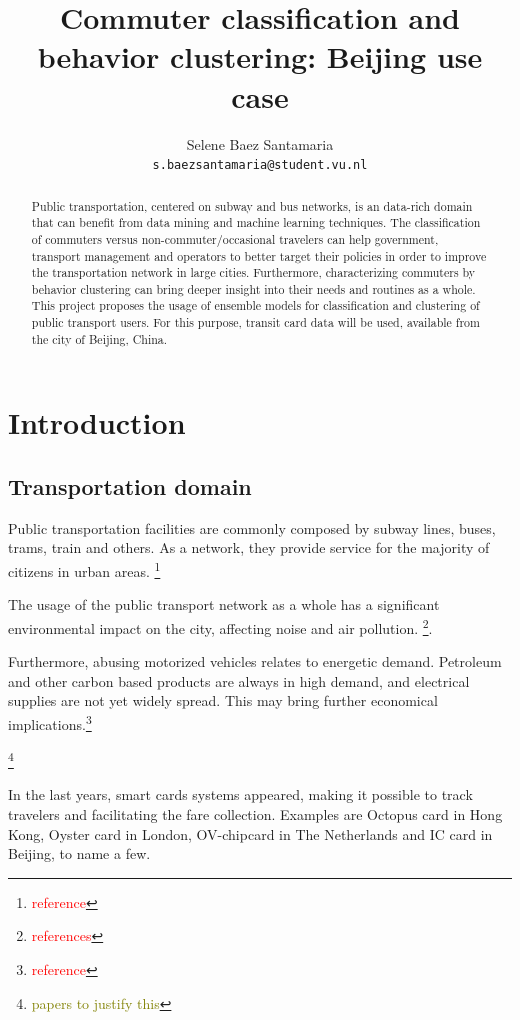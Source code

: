 \documentclass{article}
\title{Commuter classification and behavior clustering: Beijing use case}
\author{
  Selene Baez  Santamaria \\
  \texttt{s.baezsantamaria@student.vu.nl}
}
\newcommand{\selfnote}[1]{\footnote{\textcolor{red}{#1}}}
\newcommand{\Liangdoubt}[1]{\footnote{\textcolor{olive}{#1}}}
\begin{document}

\maketitle

\begin{abstract}
  Public transportation, centered on subway and bus networks, is an data-rich domain that can benefit from data mining and machine learning techniques. The classification of commuters versus non-commuter/occasional travelers can help government, transport management and operators to better target their policies in order to improve the transportation network in large cities. Furthermore, characterizing commuters by behavior clustering can bring deeper insight into their needs and routines as a whole. 
  This project proposes the usage of ensemble models for classification and clustering of public transport users. For this purpose, transit card data will be used, available from the city of Beijing, China. 
\end{abstract}

\newpage

\tableofcontents

\newpage
\section{Introduction}

\subsection{Transportation domain}
Public transportation facilities are commonly composed by subway lines, buses, trams, train and others. As a network, they provide service for the majority of citizens in urban areas. \selfnote{reference}  

The usage of the public transport network as a whole has a significant environmental impact on the city, affecting noise and air pollution. \selfnote{references}. 

Furthermore, abusing motorized vehicles relates to energetic demand. Petroleum and other carbon based products are always in high demand, and electrical supplies are not yet widely spread. This may bring further economical implications.\selfnote{reference}

\Liangdoubt{papers to justify this}

In the last years, smart cards systems appeared, making it possible to track travelers and facilitating the fare collection. Examples are Octopus card in Hong Kong, Oyster card in London, OV-chipcard in The Netherlands and IC card in Beijing, to name a few.
\end{document}

